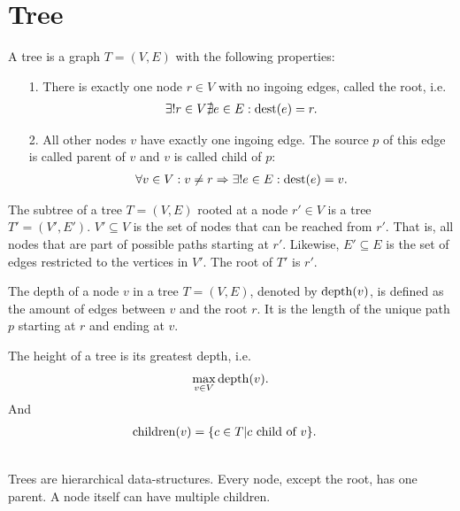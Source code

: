 \section{Tree}
	\begin{mydef}\label{tree}
		A \textnormal{tree} is a graph $T = (V, E)$ with the following properties:
		\begin{itemize}
			\item[1.] There is exactly one node $r \in V$ with no ingoing edges, called the \textnormal{root}, i.e.
				\begin{align*}
					\exists! r \in V \nexists e \in E : \operatorname{dest}(e) = r.
				\end{align*}
			\item[2.] All other nodes $v$ have exactly one ingoing edge. The source $p$ of this edge is called \textnormal{parent} of $v$ and
				$v$ is called \textnormal{child} of $p$:
				\begin{align*}
					\forall v \in V : v \neq r \Rightarrow \exists! e \in E : \operatorname{dest}(e) = v.
				\end{align*}
		\end{itemize}
	\end{mydef}
	\begin{mydef}\label{subTree}
		The \textnormal{subtree} of a tree $T = (V, E)$ rooted at a node $r' \in V$ is a tree $T' = (V', E')$. $V' \subseteq V$ is the set
		of nodes that can be reached from $r'$. That is, all nodes that are part of possible paths starting at $r'$.
		Likewise, $E' \subseteq E$ is the set of edges restricted to the vertices in $V'$. The root of $T'$ is $r'$.
	\end{mydef}
	\begin{mydef}\label{treeDepth}
		The \textnormal{depth} of a node $v$ in a tree $T = (V, E)$, denoted by $\operatorname{depth}(v)$, is defined as the amount of
		edges between $v$ and the root $r$. It is the length of the unique path $p$ starting at $r$ and ending at $v$.
		
		The \textnormal{height} of a tree is its greatest depth, i.e.
		\begin{align*}
			\max_{v \in V} \operatorname{depth}(v).
		\end{align*}
		And
		\begin{align*}
			\operatorname{children}(v)	&= \{c \in T | c \text{ child of } v\}.
		\end{align*}
	\end{mydef}\quad\\
	Trees are hierarchical data-structures. Every node, except the root, has one parent. A node itself can have multiple children.

